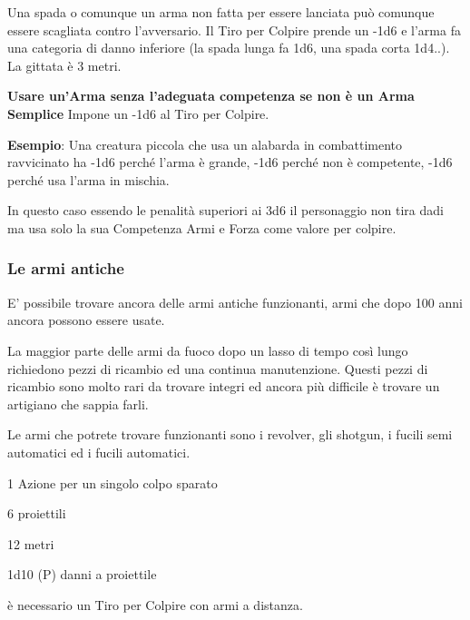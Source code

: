 \begin{multicols}{2}
Una spada o comunque un arma non fatta per essere lanciata può comunque essere scagliata contro l'avversario. Il Tiro per Colpire prende un -1d6 e l'arma fa una categoria di danno inferiore (la spada lunga fa 1d6, una spada corta 1d4..). La gittata è 3 metri.

\medskip

\textbf{Usare un'Arma senza l'adeguata competenza se non è un Arma Semplice} Impone un -1d6 al Tiro per Colpire.

\textbf{Esempio}: Una creatura piccola che usa un alabarda in combattimento ravvicinato ha -1d6 perché l'arma è grande, -1d6 perché non è competente, -1d6 perché usa l'arma in mischia.

In questo caso essendo le penalità superiori ai 3d6 il personaggio non tira dadi ma usa solo la sua Competenza Armi e Forza come valore per colpire.

\subsubsection{Le armi antiche}

E' possibile trovare ancora delle armi antiche funzionanti, armi che dopo 100 anni ancora possono essere usate.

La maggior parte delle armi da fuoco dopo un lasso di tempo così lungo richiedono pezzi di ricambio ed una continua manutenzione. Questi pezzi di ricambio sono molto rari da trovare integri ed ancora più difficile è trovare un artigiano che sappia farli.

Le armi che potrete trovare funzionanti sono i revolver, gli shotgun, i fucili semi automatici ed i fucili automatici.

\medskip

\begin{description}[noitemsep, topsep=0pt, parsep=0pt, partopsep=0pt, leftmargin=0cm, labelwidth=2cm]
\item[\textbf{Revolver}]
\item[\textbf{Azioni:}] 1 Azione per un singolo colpo sparato
\item[\textbf{Caricatore:}] 6 proiettili
\item[\textbf{Gittata:}] 12 metri
\item[\textbf{Danno:}] 1d10 (P) danni a proiettile
\item[\textbf{Regole:}] è necessario un Tiro per Colpire con armi a distanza.
\end{description}


\end{multicols}
